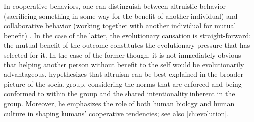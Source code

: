 In cooperative behaviors, one can distinguish between altruistic behavior (sacrificing something in some way for the benefit of another individual) and collaborative behavior (working together with another individual for mutual benefit) \citep{Tomasello09}. In the case of the latter, the evolutionary causation is straight-forward: the mutual benefit of the outcome constitutes the evolutionary pressure that has selected for it. In the case of the former though, it is not immediately obvious that helping another person without benefit to the self would be evolutionarily advantageous. \citep{Tomasello09} hypothesizes that altruism can be best explained in the broader picture of the social group, considering the norms that are enforced and being conformed to within the group and the shared intentionality inherent in the group.
Moreover, he emphasizes the role of both human biology and human culture in shaping humans' cooperative tendencies; see also \cref{ch:evolution}.

